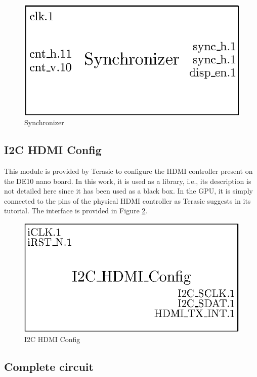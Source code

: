 \begin{figure}[H]
    \centering
    \includegraphics[scale=1.0]{Chapter4-GPU_CLKU/res/synchronizer}
    \caption{Synchronizer}
    \label{fig:gpu/synchronizer}
\end{figure}

\subsection{I2C HDMI Config}

This module is provided by Terasic to configure the HDMI controller present on the DE10 nano board. 
In this work, it is used as a library, i.e., its description is not detailed here since it has been used as a black box. In the GPU, it is simply connected to the pins of the physical
HDMI controller as Terasic suggests in its tutorial. The interface is provided in 
Figure \ref{fig:gpu/i2c}.

\begin{figure}[H]
    \centering
    \includegraphics[scale=0.8]{Chapter4-GPU_CLKU/res/i2c}
    \caption{I2C HDMI Config}
    \label{fig:gpu/i2c}
\end{figure}

\subsection{Complete circuit}

